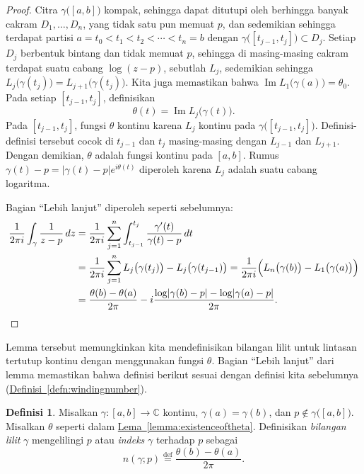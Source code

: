 \documentclass[12pt,openany]{book}
\renewcommand{\Im}{\operatorname{Im}}
\newcommand{\sabs}[1]{\lvert {#1} \rvert}
\newcommand{\C}{{\mathbb{C}}}
\newcommand{\myindex}[1]{#1\index{#1}}
\newcommand{\myquote}[1]{``#1''}
\theoremstyle{plain}
\theoremstyle{remark}
\theoremstyle{definition}
\newtheorem{defn}[thm]{Definisi}
\theoremstyle{exercise}
\theoremstyle{example}
\newcommand{\lemmaref}[1]{\hyperref[#1]{Lema~\ref*{#1}}}
\newcommand{\defnref}[1]{\hyperref[#1]{Definisi~\ref*{#1}}}
\begin{document}
\begin{proof}
Citra $\gamma\bigl([a,b]\bigr)$ kompak, sehingga dapat ditutupi oleh berhingga banyak
cakram $D_1,\ldots,D_n$, yang tidak satu pun memuat $p$, dan sedemikian sehingga terdapat
partisi $a = t_0 < t_1 < t_2 < \cdots < t_n = b$ dengan
$\gamma\bigl([t_{j-1},t_j]\bigr) \subset D_j$. Setiap $D_j$ berbentuk bintang dan
tidak memuat $p$,
sehingga di masing-masing cakram terdapat suatu cabang $\log (z-p)$, sebutlah $L_j$,
sedemikian sehingga $L_j\bigl(\gamma(t_j)\bigr) = L_{j+1}\bigl(\gamma(t_j)\bigr)$.
Kita juga memastikan bahwa $\Im L_1\bigl(\gamma(a)\bigr) = \theta_0$.
Pada setiap $[t_{j-1},t_j]$, definisikan
\begin{equation*}
\theta(t)
=
\Im L_j\bigl(\gamma(t)\bigr) .
\end{equation*}
Pada $[t_{j-1},t_j]$, fungsi $\theta$ kontinu karena $L_j$ kontinu pada 
$\gamma\bigl([t_{j-1},t_j]\bigr)$. Definisi-definisi tersebut cocok di $t_{j-1}$
dan $t_{j}$ masing-masing dengan $L_{j-1}$ dan $L_{j+1}$. Dengan demikian,
$\theta$ adalah fungsi kontinu pada $[a,b]$.
Rumus $\gamma(t)-p = \sabs{\gamma(t)-p} e^{i\theta(t)}$ diperoleh karena
$L_j$ adalah suatu cabang logaritma.

Bagian \myquote{Lebih lanjut} diperoleh seperti sebelumnya:
\begin{equation*}
\begin{split}
\frac{1}{2\pi i} \int_\gamma \frac{1}{z-p} \, dz
& =
\frac{1}{2\pi i} \sum_{j=1}^n \int_{t_{j-1}}^{t_j} \frac{\gamma'(t)}{\gamma(t)-p} \, dt
\\
& =
\frac{1}{2\pi i} \sum_{j=1}^n L_j\bigl(\gamma(t_j)\bigr) -
L_j\bigl(\gamma(t_{j-1})\bigr)
=
\frac{1}{2\pi i} \Bigl( L_n\bigl(\gamma(b)\bigr) - L_1\bigl(\gamma(a)\bigr) \Bigr) 
\\
& =
\frac{\theta(b)-\theta(a)}{2\pi}
- i \frac{\log \sabs{\gamma(b)-p} - \log \sabs{\gamma(a)-p}}{2\pi} .
\qedhere
\end{split}
\end{equation*}
\end{proof}

Lemma tersebut memungkinkan kita mendefinisikan bilangan lilit untuk lintasan tertutup kontinu
dengan menggunakan fungsi $\theta$. Bagian \myquote{Lebih lanjut} dari
lemma memastikan bahwa definisi berikut sesuai dengan definisi kita
sebelumnya (\defnref{defn:windingnumber}).

\begin{defn}
Misalkan $\gamma \colon [a,b] \to \C$ kontinu, $\gamma(a) = \gamma(b)$, dan
$p \notin \gamma\bigl([a,b]\bigr)$. Misalkan $\theta$ seperti dalam
\lemmaref{lemma:existenceoftheta}. Definisikan
\emph{\myindex{bilangan lilit}} $\gamma$ mengelilingi $p$ atau
\emph{\myindex{indeks}} $\gamma$ terhadap $p$
sebagai
%
\begin{equation*}
n(\gamma;p)
\overset{\text{def}}{=}
\frac{\theta(b)-\theta(a)}{2\pi}.
\end{equation*}
\end{defn}
\end{document}
